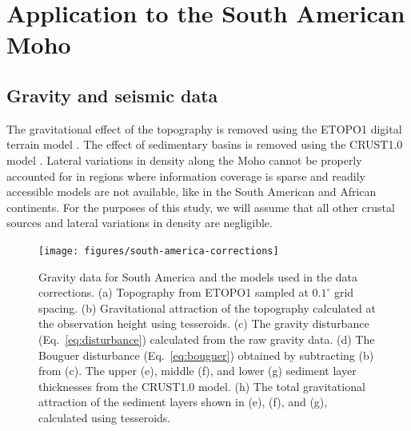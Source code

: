 \documentclass[extra,mreferee]{gji}
\begin{document}
\section{Application to the South American Moho}


\subsection{Gravity and seismic data}

The gravitational effect of the topography
is removed using the
ETOPO1 digital terrain model
\citep[][ \url{http://dx.doi.org/10.7289/V5C8276M}]{amante2009}.
The effect of sedimentary basins is removed using the
CRUST1.0 model
\citep[][ \url{http://igppweb.ucsd.edu/~gabi/rem.html}]{laske2013}.
Lateral variations in density along the Moho cannot be properly accounted for
in regions where information coverage is sparse and readily accessible models
are not available, like in the South American and African continents.
For the purposes of this study, we will assume that all other crustal sources
and lateral variations in density are negligible.

\begin{figure}
    \centering
    \texttt{[image: figures/south-america-corrections]}
    \caption{
        Gravity data for South America and the models used in the data
        corrections.
        (a) Topography from ETOPO1 sampled at $0.1^\circ$ grid spacing.
        (b) Gravitational attraction of the topography calculated
        at the observation height using tesseroids.
        (c) The gravity disturbance (Eq.~\ref{eq:disturbance}) calculated from
        the raw gravity data.
        (d) The Bouguer disturbance (Eq.~\ref{eq:bouguer}) obtained by
        subtracting (b) from (c).
        The upper (e), middle (f), and lower (g) sediment layer thicknesses
        from the CRUST1.0 model.
        (h) The total gravitational attraction of the sediment layers shown in
        (e), (f), and (g), calculated using tesseroids.
        }
    \label{fig:sam-corrections}
\end{figure}
\end{document}
